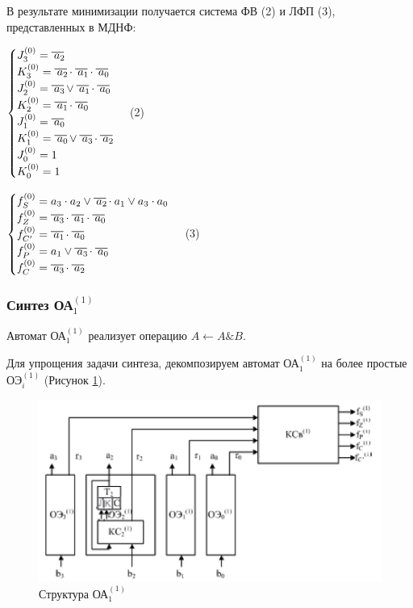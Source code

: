 

В результате минимизации получается система ФВ (2) и ЛФП (3), представленных в МДНФ:

$
\begin{cases}
J^{(0)}_{3} = \oline{a_2}
\\
K^{(0)}_{3} = \oline{a_2} \cdot \oline{a_1} \cdot \oline{a_0}
\\
J^{(0)}_{2} = \oline{a_3} \vee \oline{a_1} \cdot \oline{a_0}
\\
K^{(0)}_{2} = \oline{a_1} \cdot \oline{a_0}
\\
J^{(0)}_{1} = \oline{a_0}
\\
K^{(0)}_{1} = \oline{a_0} \vee \oline{a_3} \cdot \oline{a_2}
\\
J^{(0)}_{0} = 1
\\
K^{(0)}_{0} = 1
\end{cases}
$ (2)

$
\begin{cases}
f^{(0)}_{S} = a_3 \cdot a_2 \vee \oline{a_2} \cdot a_1 \vee a_3 \cdot a_0
\\
f^{(0)}_{Z} = \oline{a_3} \cdot \oline{a_1} \cdot \oline{a_0}
\\
f^{(0)}_{C'} = \oline{a_1} \cdot \oline{a_0}
\\
f^{(0)}_{P} = a_1 \vee \oline{a_3} \cdot \oline{a_0}
\\
f^{(0)}_{C} = \oline{a_3} \cdot \oline{a_2}
\end{cases}
$ (3)


\subsubsection{Синтез ОА$^{(1)}_{1}$}

Автомат ОА$^{(1)}_{1}$ реализует операцию $A \leftarrow A \& B$.

Для упрощения задачи синтеза, декомпозируем автомат ОА$^{(1)}_{1}$ на более простые ОЭ$^{(1)}_i$ (Рисунок \ref{figure:oa11_str}). 

\begin{figure}[H]
	\includegraphics[scale=0.6]{images/oe.png}
	\caption{Структура ОА$^{(1)}_{1}$}
	\label{figure:oa11_str}
\end{figure}


